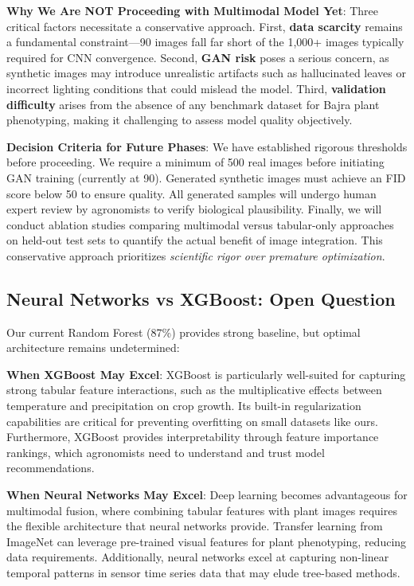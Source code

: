 \documentclass[10pt,twocolumn]{article}
\begin{document}
\textbf{Why We Are NOT Proceeding with Multimodal Model Yet}: Three critical factors necessitate a conservative approach. First, \textbf{data scarcity} remains a fundamental constraint—90 images fall far short of the 1,000+ images typically required for CNN convergence. Second, \textbf{GAN risk} poses a serious concern, as synthetic images may introduce unrealistic artifacts such as hallucinated leaves or incorrect lighting conditions that could mislead the model. Third, \textbf{validation difficulty} arises from the absence of any benchmark dataset for Bajra plant phenotyping, making it challenging to assess model quality objectively.

\textbf{Decision Criteria for Future Phases}: We have established rigorous thresholds before proceeding. We require a minimum of 500 real images before initiating GAN training (currently at 90). Generated synthetic images must achieve an FID score below 50 to ensure quality. All generated samples will undergo human expert review by agronomists to verify biological plausibility. Finally, we will conduct ablation studies comparing multimodal versus tabular-only approaches on held-out test sets to quantify the actual benefit of image integration. This conservative approach prioritizes \textit{scientific rigor over premature optimization}.

\subsection{Neural Networks vs XGBoost: Open Question}

Our current Random Forest (87\%) provides strong baseline, but optimal architecture remains undetermined:

\textbf{When XGBoost May Excel}: XGBoost is particularly well-suited for capturing strong tabular feature interactions, such as the multiplicative effects between temperature and precipitation on crop growth. Its built-in regularization capabilities are critical for preventing overfitting on small datasets like ours. Furthermore, XGBoost provides interpretability through feature importance rankings, which agronomists need to understand and trust model recommendations.

\textbf{When Neural Networks May Excel}: Deep learning becomes advantageous for multimodal fusion, where combining tabular features with plant images requires the flexible architecture that neural networks provide. Transfer learning from ImageNet can leverage pre-trained visual features for plant phenotyping, reducing data requirements. Additionally, neural networks excel at capturing non-linear temporal patterns in sensor time series data that may elude tree-based methods.
\end{document}
